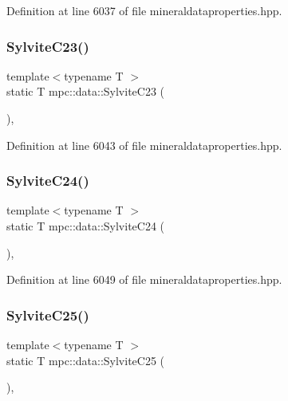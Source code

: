 Definition at line 6037 of file mineraldataproperties.\+hpp.

\mbox{\label{namespacempc_1_1data_a91f158b5fd7e2557b0b49cd3884fa2e3}} 
\subsubsection{\texorpdfstring{Sylvite\+C23()}{SylviteC23()}}
{\footnotesize\ttfamily template$<$typename T $>$ \\
static T mpc\+::data\+::\+Sylvite\+C23 (\begin{DoxyParamCaption}{ }\end{DoxyParamCaption})\hspace{0.3cm}{\ttfamily [inline]}, {\ttfamily [static]}}



Definition at line 6043 of file mineraldataproperties.\+hpp.

\mbox{\label{namespacempc_1_1data_a8a20fb0a929243aa012c53c7cb85ae01}} 
\subsubsection{\texorpdfstring{Sylvite\+C24()}{SylviteC24()}}
{\footnotesize\ttfamily template$<$typename T $>$ \\
static T mpc\+::data\+::\+Sylvite\+C24 (\begin{DoxyParamCaption}{ }\end{DoxyParamCaption})\hspace{0.3cm}{\ttfamily [inline]}, {\ttfamily [static]}}



Definition at line 6049 of file mineraldataproperties.\+hpp.

\mbox{\label{namespacempc_1_1data_ab162d0a13b908a0695b073ed92052ffe}} 
\subsubsection{\texorpdfstring{Sylvite\+C25()}{SylviteC25()}}
{\footnotesize\ttfamily template$<$typename T $>$ \\
static T mpc\+::data\+::\+Sylvite\+C25 (\begin{DoxyParamCaption}{ }\end{DoxyParamCaption})\hspace{0.3cm}{\ttfamily [inline]}, {\ttfamily [static]}}



